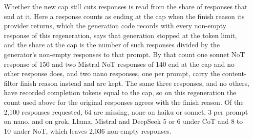 Whether the new cap still cuts responses is read from the share of responses
that end at it. Here a response counts as ending at the cap when the finish
reason its provider returns, which the generation code records with every
non-empty response of this regeneration, says that generation stopped at the
token limit, and the share at the cap is the number of such responses divided
by the generator's non-empty responses to that prompt. By that count one
sonnet NoT response of 150 and two Mistral NoT responses of 140 end at the cap
and no other response does, and two nano responses, one per prompt, carry the
content-filter finish reason instead and are kept.
The same three responses, and no others, have recorded completion tokens
equal to the cap, so on this regeneration the count used above for the
original responses agrees with the finish reason.
Of the 2,100 responses requested, 64 are missing, none on haiku or sonnet, 3
per prompt on nano, and on grok, Llama, Mistral and DeepSeek 5 or 6 under CoT
and 8 to 10 under NoT, which leaves 2,036 non-empty responses.
